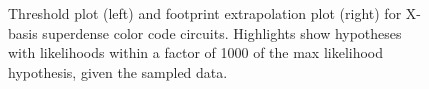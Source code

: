 \documentclass[onecolumn,unpublished,a4paper]{quantumarticle}
\theoremstyle{definition}
\theoremstyle{definition}
\theoremstyle{definition}
\begin{document}
\begin{figure}
    \centering
    \hfill
    \caption{
        Threshold plot (left) and footprint extrapolation plot (right) for X-basis superdense color code circuits.
        Highlights show hypotheses with likelihoods within a factor of 1000 of the max likelihood hypothesis, given the sampled data.
    }
    \label{fig:superdense-x}
\end{figure}
\end{document}
